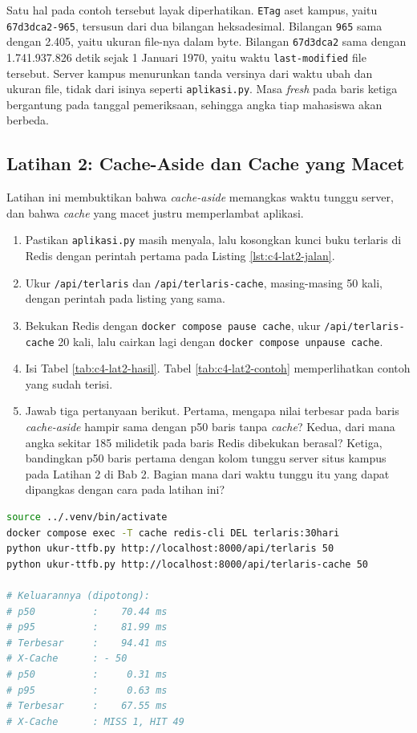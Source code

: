 Satu hal pada contoh tersebut layak diperhatikan. \texttt{ETag} aset kampus,
yaitu \texttt{67d3dca2-965}, tersusun dari dua bilangan heksadesimal. Bilangan
\texttt{965} sama dengan 2.405, yaitu ukuran file-nya dalam byte. Bilangan
\texttt{67d3dca2} sama dengan 1.741.937.826 detik sejak 1 Januari 1970, yaitu
waktu \texttt{last-modified} file tersebut. Server kampus menurunkan tanda
versinya dari waktu ubah dan ukuran file, tidak dari isinya seperti
\texttt{aplikasi.py}. Masa \textit{fresh} pada baris ketiga bergantung pada tanggal
pemeriksaan, sehingga angka tiap mahasiswa akan berbeda.

\subsection*{Latihan 2: Cache-Aside dan Cache yang Macet}

Latihan ini membuktikan bahwa \textit{cache-aside} memangkas waktu tunggu
server, dan bahwa \textit{cache} yang macet justru memperlambat aplikasi.

\begin{enumerate}
  \item Pastikan \texttt{aplikasi.py} masih menyala, lalu kosongkan kunci
        buku terlaris di Redis dengan perintah pertama pada Listing
        \ref{lst:c4-lat2-jalan}.
  \item Ukur \texttt{/api/terlaris} dan \texttt{/api/terlaris-cache}, masing-masing
        50 kali, dengan perintah pada listing yang sama.
  \item Bekukan Redis dengan \texttt{docker compose pause cache}, ukur
        \texttt{/api/terlaris-cache} 20 kali, lalu cairkan lagi dengan
        \texttt{docker compose unpause cache}.
  \item Isi Tabel \ref{tab:c4-lat2-hasil}. Tabel \ref{tab:c4-lat2-contoh}
        memperlihatkan contoh yang sudah terisi.
  \item Jawab tiga pertanyaan berikut. Pertama, mengapa nilai terbesar pada
        baris \textit{cache-aside} hampir sama dengan p50 baris tanpa
        \textit{cache}? Kedua, dari mana angka sekitar 185 milidetik pada
        baris Redis dibekukan berasal? Ketiga, bandingkan p50 baris pertama
        dengan kolom tunggu server situs kampus pada Latihan 2 di Bab 2. Bagian
        mana dari waktu tunggu itu yang dapat dipangkas dengan cara pada
        latihan ini?
\end{enumerate}

\begin{lstlisting}[language=bash, caption={Mengukur waktu sampai byte pertama, tersedia di \berkas{sources/chapter04/ukur-ttfb.py}}, label={lst:c4-lat2-jalan}]
source ../.venv/bin/activate
docker compose exec -T cache redis-cli DEL terlaris:30hari
python ukur-ttfb.py http://localhost:8000/api/terlaris 50
python ukur-ttfb.py http://localhost:8000/api/terlaris-cache 50

# Keluarannya (dipotong):
# p50          :    70.44 ms
# p95          :    81.99 ms
# Terbesar     :    94.41 ms
# X-Cache      : - 50
# p50          :     0.31 ms
# p95          :     0.63 ms
# Terbesar     :    67.55 ms
# X-Cache      : MISS 1, HIT 49
\end{lstlisting}

